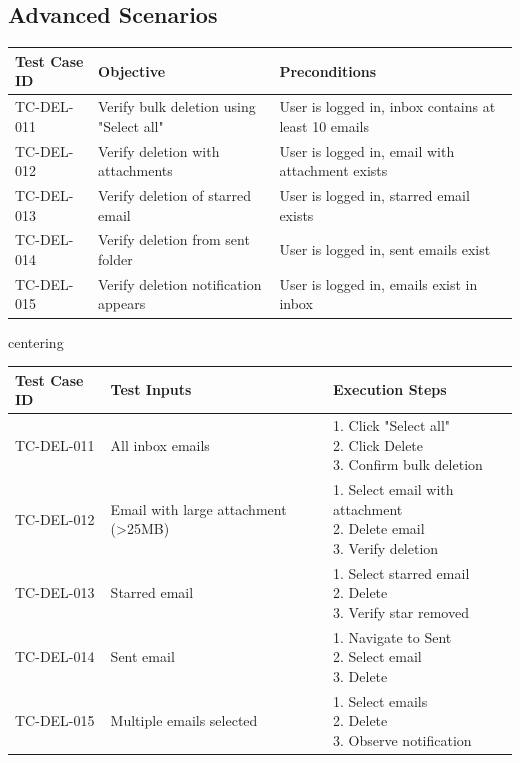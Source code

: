 \documentclass[12pt,a4paper]{article}
\begin{document}
\subsection{Advanced Scenarios}

\begin{table}[h!]
\centering
\begin{tabular}{|p{3cm}|p{5cm}|p{7cm}|}
\hline
\textbf{Test Case ID} & \textbf{Objective} & \textbf{Preconditions} \\
\hline
TC-DEL-011 & Verify bulk deletion using "Select all" & User is logged in, inbox contains at least 10 emails \\
\hline
TC-DEL-012 & Verify deletion with attachments & User is logged in, email with attachment exists \\
\hline
TC-DEL-013 & Verify deletion of starred email & User is logged in, starred email exists \\
\hline
TC-DEL-014 & Verify deletion from sent folder & User is logged in, sent emails exist \\
\hline
TC-DEL-015 & Verify deletion notification appears & User is logged in, emails exist in inbox \\
\hline
\end{tabular}
\end{table}

\begin{table}[h!]
centering
\begin{tabular}{|p{3cm}|p{5cm}|p{7cm}|}
\hline
\textbf{Test Case ID} & \textbf{Test Inputs} & \textbf{Execution Steps} \\
\hline
TC-DEL-011 & All inbox emails & \parbox{5cm}{1. Click "Select all"\\2. Click Delete\\3. Confirm bulk deletion} \\
\hline
TC-DEL-012 & Email with large attachment (>25MB) & \parbox{5cm}{1. Select email with attachment\\2. Delete email\\3. Verify deletion} \\
\hline
TC-DEL-013 & Starred email & \parbox{5cm}{1. Select starred email\\2. Delete\\3. Verify star removed} \\
\hline
TC-DEL-014 & Sent email & \parbox{5cm}{1. Navigate to Sent\\2. Select email\\3. Delete} \\
\hline
TC-DEL-015 & Multiple emails selected & \parbox{5cm}{1. Select emails\\2. Delete\\3. Observe notification} \\
\hline
\end{tabular}
\end{table}
\end{document}
